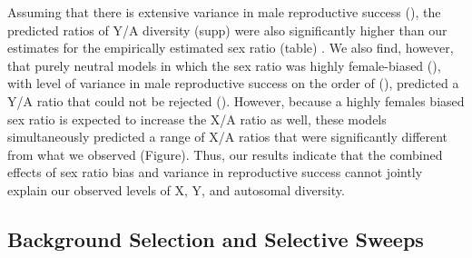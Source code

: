\documentclass[9pt,twocolumn,twoside]{gsajnl}
\begin{document}
Assuming that there is extensive variance in male reproductive success (\X), the predicted ratios of Y/A diversity (\X supp) were also significantly higher than our estimates for the empirically estimated sex ratio (\X table) . We also find, however, that purely neutral models in which the sex ratio was highly female-biased (\X), with level of variance in male reproductive success on the order of (\X), predicted a Y/A ratio that could not be rejected (\X). However, because a highly females biased sex ratio is expected to increase the X/A ratio as well, these models simultaneously predicted a range of X/A ratios that were significantly different from what we observed (\X Figure). Thus, our results indicate that the combined effects of sex ratio bias and variance in reproductive success cannot jointly explain our observed levels of X, Y, and autosomal diversity.

\subsection*{Background Selection and Selective Sweeps}






\end{document}
